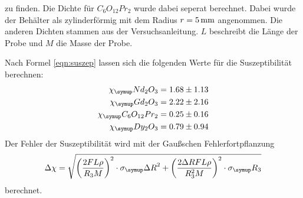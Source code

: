 zu finden. Die Dichte für $C_6O_{12}Pr_2$ wurde dabei seperat berechnet. Dabei wurde
der Behälter als zylinderförmig mit dem Radius $r=5\,\si{\milli\meter}$ angenommen. Die anderen Dichten
stammen aus der Versuchsanleitung. $L$ beschreibt die Länge der Probe und $M$ die
Masse der Probe.

Nach Formel \eqref{eqn:suszep} lassen sich die folgenden Werte für die Suszeptibilität
berechnen:
\begin{align*}
  \chi_\su{Nd_2O_3}       &= 1.68 \pm 1.13 \\
  \chi_\su{Gd_2O_3}       &= 2.22 \pm 2.16 \\
  \chi_\su{C_6O_{12}Pr_2} &= 0.25 \pm 0.16 \\
  \chi_\su{Dy_2O_3}       &= 0.79 \pm 0.94 %
\end{align*}
Der Fehler der Suszeptibilität wird mit der Gaußschen Fehlerfortpflanzung
\begin{equation*}
  \Delta\chi = \sqrt{\left(\frac{2FL\rho}{R_3M}\right)^2\cdot\sigma_\su{\Delta R}^2
  + \left(\frac{2\Delta R FL\rho}{R_3^2M}\right)^2\cdot\sigma_\su{R_3}}
\end{equation*}
berechnet.
